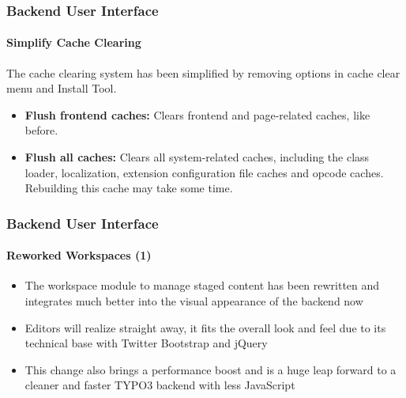 \begin{frame}[fragile]
	\frametitle{Backend User Interface}
	\framesubtitle{Simplify Cache Clearing}

	The cache clearing system has been simplified by removing options in cache clear menu and
	Install Tool.

	\begin{itemize}

		\item \textbf{Flush frontend caches:}\newline
			\small
				Clears frontend and page-related caches, like before.
			\normalsize

		\item \textbf{Flush all caches:}\newline
			\small
				Clears all system-related caches, including the class loader, localization,
				extension configuration file caches and opcode caches. Rebuilding this cache
				may take some time.
			\normalsize

	\end{itemize}


\end{frame}

\begin{frame}[fragile]
	\frametitle{Backend User Interface}
	\framesubtitle{Reworked Workspaces (1)}

	\begin{itemize}

		\item The workspace module to manage staged content has been rewritten and
			integrates much better into the visual appearance of the backend now

		\item Editors will realize straight away, it fits the overall look and feel
			due to its technical base with Twitter Bootstrap and jQuery

		\item This change also brings a performance boost and is a huge leap forward
			to a cleaner and faster TYPO3 backend with less JavaScript

	\end{itemize}

\end{frame}

